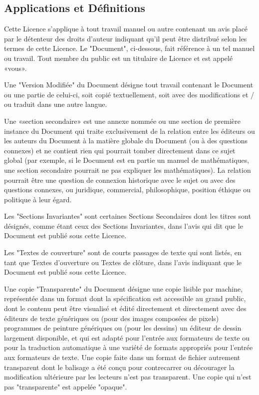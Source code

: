 	\subsection{Applications et D\'efinitions}
	Cette Licence s'applique à tout travail manuel ou autre contenant un avis plac\'e par le d\'etenteur des droits d'auteur indiquant qu'il peut être distribu\'e selon les termes de cette Licence. Le "Document", ci-dessous, fait r\'ef\'erence à un tel manuel ou travail. Tout membre du public est un titulaire de Licence et est appel\'e «vous».

	Une "Version Modifi\'ee" du Document d\'esigne tout travail contenant le Document ou une partie de celui-ci, soit copi\'e textuellement, soit avec des modifications et / ou traduit dans une autre langue.

	Une «section secondaire» est une annexe nomm\'ee ou une section de première instance du Document qui traite exclusivement de la relation entre les \'editeurs ou les auteurs du Document à la matière globale du Document (ou à des questions connexes) et ne contient rien qui pourrait tomber directement dans ce sujet global (par exemple, si le Document est en partie un manuel de math\'ematiques, une section secondaire pourrait ne pas expliquer les math\'ematiques). La relation pourrait être une question de connexion historique avec le sujet ou avec des questions connexes, ou juridique, commercial, philosophique, position \'ethique ou politique à leur \'egard.
	
	Les "Sections Invariantes" sont certaines Sections Secondaires dont les titres sont d\'esign\'es, comme \'etant ceux des Sections Invariantes, dans l'avis qui dit que le Document est publi\'e sous cette Licence.

	Les "Textes de couverture" sont de courts passages de texte qui sont list\'es, en tant que Textes d'ouverture ou Textes de clôture, dans l'avis indiquant que le Document est publi\'e sous cette Licence.

	Une copie "Transparente" du Document d\'esigne une copie lisible par machine, repr\'esent\'ee dans un format dont la sp\'ecification est accessible au grand public, dont le contenu peut être visualis\'e et \'edit\'e directement et directement avec des \'editeurs de texte g\'en\'eriques ou (pour des images compos\'ees de pixels) programmes de peinture g\'en\'eriques ou (pour les dessins) un \'editeur de dessin largement disponible, et qui est adapt\'e pour l'entr\'ee aux formateurs de texte ou pour la traduction automatique à une vari\'et\'e de formats appropri\'es pour l'entr\'ee aux formateurs de texte. Une copie faite dans un format de fichier autrement transparent dont le balisage a \'et\'e conçu pour contrecarrer ou d\'ecourager la modification ult\'erieure par les lecteurs n'est pas transparent. Une copie qui n'est pas "transparente" est appel\'ee "opaque".

